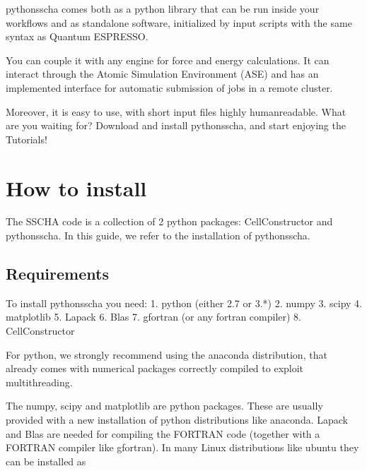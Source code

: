 \documentclass[a4paper,11pt,english]{sphinxmanual}
\begin{document}
\sphinxAtStartPar
python\sphinxhyphen{}sscha comes both as a python library that can be run inside your workflows and as stand\sphinxhyphen{}alone software, initialized by input scripts with the same syntax as Quantum ESPRESSO.

\sphinxAtStartPar
You can couple it with any  engine for force and energy calculations. It can interact through the Atomic Simulation Environment (ASE) and has an implemented interface for automatic submission of jobs in a remote cluster.

\sphinxAtStartPar
Moreover, it is easy to use, with short input files highly human\sphinxhyphen{}readable.
What are you waiting for? Download and install python\sphinxhyphen{}sscha, and start enjoying the Tutorials!

\sphinxstepscope


\chapter{How to install}
\label{\detokenize{install:how-to-install}}\label{\detokenize{install::doc}}
\sphinxAtStartPar
The SSCHA code is a collection of 2 python packages: CellConstructor and python\sphinxhyphen{}sscha.
In this guide, we refer to the installation of python\sphinxhyphen{}sscha.


\section{Requirements}
\label{\detokenize{install:requirements}}
\sphinxAtStartPar
To install python\sphinxhyphen{}sscha you need:
1. python (either 2.7 or 3.*)
2. numpy
3. scipy
4. matplotlib
5. Lapack
6. Blas
7. gfortran (or any fortran compiler)
8. CellConstructor

\sphinxAtStartPar
For python, we strongly recommend using the anaconda distribution, that already comes with numerical packages correctly compiled to exploit multithreading.

\sphinxAtStartPar
The numpy, scipy and matplotlib are python packages. These are usually provided with a new installation
of python distributions like anaconda. Lapack and Blas are needed for compiling the FORTRAN code (together with a FORTRAN compiler like gfortran).
In many Linux distributions like ubuntu they can be installed as

\begin{sphinxVerbatim}[commandchars=\\\{\}]
\end{sphinxVerbatim}
\end{document}
